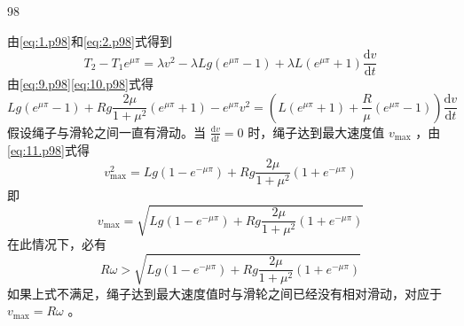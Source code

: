 \begin{solution}{98}
\begin{subsolution}
        由\eqref{eq:1.p98}和\eqref{eq:2.p98}式得到
        \begin{equation}
            T _ {2} - T _ {1} e ^ {\mu \pi} = \lambda v ^ {2} - \lambda L g (e ^ {\mu \pi} - 1) + \lambda L (e ^ {\mu \pi} + 1) \frac {\mathrm{d} v}{\mathrm{d} t}
            \label{eq:10.p98}
        \end{equation}
        由\eqref{eq:9.p98}\eqref{eq:10.p98}式得
        \begin{equation}
            L g \left(e ^ {\mu \pi} - 1\right) + R g \frac {2 \mu}{1 + \mu^ {2}} \left(e ^ {\mu \pi} + 1\right) - e ^ {\mu \pi} v ^ {2} = \left(L \left(e ^ {\mu \pi} + 1\right) + \frac {R}{\mu} \left(e ^ {\mu \pi} - 1\right)\right) \frac {\mathrm{d} v}{\mathrm{d} t}
            \label{eq:11.p98}
        \end{equation}
        假设绳子与滑轮之间一直有滑动。当 $\frac{\mathrm{d}v}{\mathrm{d}t}=0$ 时，绳子达到最大速度值 $v_{\max}$ ，由\eqref{eq:11.p98}式得
        \begin{equation*}
            v _ {\max} ^ {2} = L g \left(1 - e ^ {- \mu \pi}\right) + R g \frac {2 \mu}{1 + \mu^ {2}} \left(1 + e ^ {- \mu \pi}\right)
        \end{equation*}
        即
        \begin{equation}
            v _ {\max} = \sqrt {L g (1 - e ^ {- \mu \pi}) + R g \frac {2 \mu}{1 + \mu^ {2}} (1 + e ^ {- \mu \pi})}
            \label{eq:12.p98}
        \end{equation}
        在此情况下，必有
        \begin{equation}
            R \omega > \sqrt {L g (1 - e ^ {- \mu \pi}) + R g \frac {2 \mu}{1 + \mu^ {2}} (1 + e ^ {- \mu \pi})}
            \label{eq:13.p98}
        \end{equation}
        如果上式不满足，绳子达到最大速度值时与滑轮之间已经没有相对滑动，对应于 $v_{\max}=R\omega$ 。
    \end{subsolution}
\end{solution}